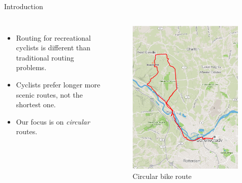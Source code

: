 \documentclass{beamer}
\begin{document}
\begin{frame}{Introduction}

\begin{columns}
    \begin{itemize}
        \item Routing for recreational cyclists is different than traditional routing problems.
        \item Cyclists prefer longer more scenic routes, not the shortest one. 
        \item Our focus is on \emph{circular} routes.   
    \end{itemize}
\begin{center}
\begin{figure}
\includegraphics[width=0.98\textwidth]{figs/circular_route}
\caption{Circular bike route}
\end{figure}
\end{center}

\end{columns}


\end{frame}
\end{document}
